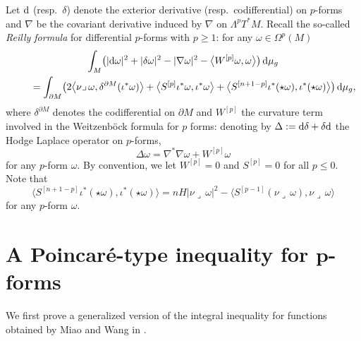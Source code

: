 \documentclass[pdftex]{sigma}
\numberwithin{equation}{section}
\begin{document}
Let ${\rm d}$ (resp.\ $\delta$) denote the exterior derivative (resp.\ codifferential) on $p$-forms and $\nabla$ be the covariant derivative induced by $\nabla$ on $\Lambda^pT^*M$.
Recall the so-called \emph{Reilly formula} \cite[Theorem~3]{RaulotSavo11} for differential $p$-forms with $p\geq 1$: for any $\omega\in\Omega^p(M)$
\begin{gather}
\int_M\bigl(|{\rm d}\omega|^2+|\delta\omega|^2-|\nabla\omega|^2-\bigl\langle W^{[p]}\omega,\omega\bigr\rangle\bigr)\,{\rm d}\mu_g \nonumber\\
\qquad{} =\int_{\partial M}\bigl(2\bigl\langle\nu\lrcorner\,\omega,\delta^{\partial M}(\iota^*\omega)\bigr\rangle+\bigl\langle S^{[p]}\iota^*\omega,\iota^*\omega\bigr\rangle+\bigl\langle S^{[n+1-p]}\iota^*(\star\omega),\iota^*(\star\omega)\bigr\rangle\bigr)\,{\rm d}\mu_g,\label{eq:Reillyformula}
\end{gather}
where $\delta^{\partial M}$ denotes the codifferential on $\partial M$ and $W^{[p]}$ the curvature term involved in the Weitzenb\"ock formula for $p$ forms: denoting by $\Delta:={\rm d}\delta+\delta {\rm d}$ the Hodge Laplace operator on $p$-forms,
\[\Delta\omega=\nabla^*\nabla\omega+W^{[p]}\omega\]
for any $p$-form $\omega$.  By convention, we let $W^{[p]}=0$ and $S^{[p]}=0$ for all $p\leq 0$.
Note that \cite[Theorem 3]{RaulotSavo11}
\begin{equation*}%
\bigl\langle S^{[n+1-p]}\iota^*(\star\omega),\iota^*(\star\omega)\bigr\rangle=nH|\nu\lrcorner\,\omega|^2-\bigl\langle S^{[p-1]}(\nu\lrcorner\,\omega),\nu\lrcorner\,\omega\bigr\rangle
\end{equation*}
for any $p$-form $\omega$.

\section[A Poincar\'e-type inequality for p-forms]{A Poincar\'e-type inequality for $\boldsymbol p$-forms}\label{s:Poincareineqpformsgeneral}

We first prove a generalized version of the integral i\-ne\-qua\-li\-ty for functions obtained by Miao and Wang in \cite[equation~(1.3)]{MiaoWang14}.
\end{document}
